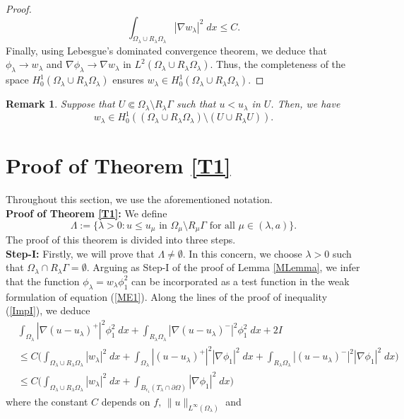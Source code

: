 \documentclass[11pt, notitlepage]{article}
\newtheorem{Remark}[Theorem]{Remark}
\begin{document}
{\begin{proof}
$$\int_{\Omega_\lambda\cup R_\lambda\Omega_\lambda}|\nabla w_\lambda|^2\;dx\leq C.$$ Finally, using Lebesgue's dominated convergence theorem, we deduce that $\phi_\lambda\to w_\lambda$  and $\nabla\phi_\lambda\to \nabla w_\lambda$ in $L^2(\Omega_\lambda\cup R_\lambda\Omega_\lambda)$. Thus, the completeness of the space $H^1_0(\Omega_\lambda\cup R_\lambda\Omega_\lambda)$ ensures $w_\lambda\in H^1_0(\Omega_\lambda\cup R_\lambda\Omega_\lambda)$.
\end{proof}
\begin{Remark}\label{R1}
    Suppose that $U\Subset\Omega_\lambda\setminus R_\lambda\Gamma$ such that $u<u_\lambda$ in $U$. Then, we have $$w_\lambda\in H^1_0((\Omega_\lambda\cup R_\lambda\Omega_\lambda)\setminus (U\cup R_\lambda U)).$$
\end{Remark}
\section{Proof of Theorem \ref{T1}}
Throughout this section, we use the aforementioned notation.\\
\textbf{Proof of Theorem \ref{T1}:} We define $$\Lambda:=\{\lambda>0: u\leq u_\mu \text{ in }\Omega_\mu\setminus R_\mu\Gamma \text{ for all }\mu\in (\lambda,a)\}.$$ The proof of this theorem is divided into three steps.\\
\textbf{Step-I:} Firstly, we will prove that $\Lambda\neq\emptyset$. In this concern, we choose $\lambda>0$ such that $\Omega_\lambda\cap R_\lambda\Gamma=\emptyset$. Arguing as Step-I of the proof of Lemma \ref{MLemma}, we infer that the function $\phi_\lambda=w_\lambda\phi_1^2$ can be incorporated as a test function in the weak formulation of equation (\ref{ME1}). Along the lines of the proof of inequality (\ref{ImpI}), we deduce
\begin{align}\label{Satya1}
    &\int_{\Omega_\lambda}|\nabla(u-u_\lambda)^+|^2\phi_1^2\;dx+\int_{R_\lambda\Omega_\lambda}|\nabla(u-u_\lambda)^-|^2\phi_1^2\;dx+2I\nonumber\\
    &\leq C\Big(\int_{\Omega_\lambda\cup R_\lambda\Omega_\lambda} |w_\lambda|^2\;dx+\int_{\Omega_\lambda}|(u-u_\lambda)^+|^2|\nabla\phi_1|^2\;dx+\int_{R_\lambda\Omega_\lambda}|(u-u_\lambda)^-|^2|\nabla\phi_1|^2\;dx\Big)\nonumber\\
    &\leq C\Big(\int_{\Omega_\lambda\cup R_\lambda\Omega_\lambda} |w_\lambda|^2\;dx+\int_{B_{\epsilon_1}(T_\lambda\cap\partial\Omega)}|\nabla\phi_1|^2\;dx\Big)
\end{align}
where the constant $C$ depends on $f,\,\|u\|_{L^\infty(\Omega_\lambda)}$ and 
}
\end{document}
